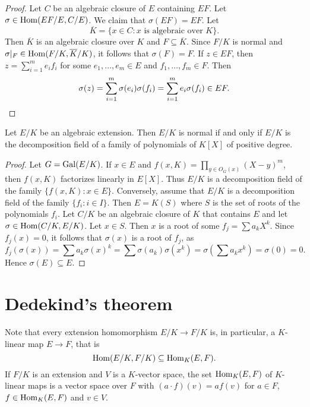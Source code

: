 \begin{proof}
    Let $C$ be an algebraic closure of $E$ containing $EF$. 
    Let $\sigma\in\operatorname{Hom}(EF/E,C/E)$. We claim that $\sigma(EF)=EF$. Let 
    \[
    \overline{K}=\{x\in C:x\text{ is algebraic over $K$}\}.
    \]
    Then $\overline{K}$ is an algebraic closure over $K$ and $F\subseteq\overline{K}$. 
    Since $F/K$ is normal and $\sigma|_F\in\operatorname{Hom}(F/K,\overline{K}/K)$, 
    it follows that $\sigma(F)=F$. If $z\in EF$, then
    $z=\sum_{i=1}^m e_if_i$ for some $e_1,\dots,e_m\in E$ and 
    $f_1,\dots,f_m\in F$. Then 
    \[
    \sigma(z)=\sum_{i=1}^m\sigma(e_i)\sigma(f_i)=\sum_{i=1}^m e_i\sigma(f_i)\in EF.\qedhere 
    \]
\end{proof}

\begin{proposition}
    Let $E/K$ be an algebraic extension. Then 
    $E/K$ is normal if and only if $E/K$ is the decomposition field
    of a family of polynomials of $K[X]$ of positive degree.
\end{proposition}

\begin{proof}
    Let $G=\operatorname{Gal}(E/K)$. If $x\in E$ and $f(x,K)=\prod_{y\in O_G(x)}(X-y)^m$, 
    then $f(x,K)$ factorizes linearly in $E[X]$. Thus 
    $E/K$ is a decomposition field of the family 
    $\{f(x,K):x\in E\}$. 
    Conversely, assume that $E/K$ is a decomposition field of the family 
    $\{f_i:i\in I\}$. Then $E=K(S)$ where $S$ is the set of roots
    of the polynomials $f_i$. Let $C/K$ be an algebraic closure
    of $K$ that contains $E$ and let $\sigma\in\operatorname{Hom}(C/K,E/K)$. Let $x\in S$. 
    Then $x$ is a root of some $f_j=\sum a_kX^k$. Since $f_j(x)=0$, 
    it follows that $\sigma(x)$ is a root of $f_j$, as 
    \[
    f_j(\sigma(x))=\sum a_k\sigma(x)^k
    =\sum\sigma(a_k)\sigma(x^k)
    =\sigma\left(\sum a_kx^k\right)=\sigma(0)=0.
    \]
    Hence $\sigma(E)\subseteq E$. 
\end{proof}

\section{Dedekind's theorem}

Note that every extension homomorphism $E/K\to F/K$ is, in particular, 
a $K$-linear map $E\to F$, that is
\[
\operatorname{Hom}(E/K,F/K)\subseteq\operatorname{Hom}_K(E,F).
\]
If $F/K$ is an extension and $V$ 
is a $K$-vector space, the set
$\operatorname{Hom}_K(E,F)$ of $K$-linear maps
is a vector space over $F$ with
$(a\cdot f)(v)=af(v)$ for $a\in F$, $f\in\operatorname{Hom}_K(E,F)$ and $v\in V$. 

